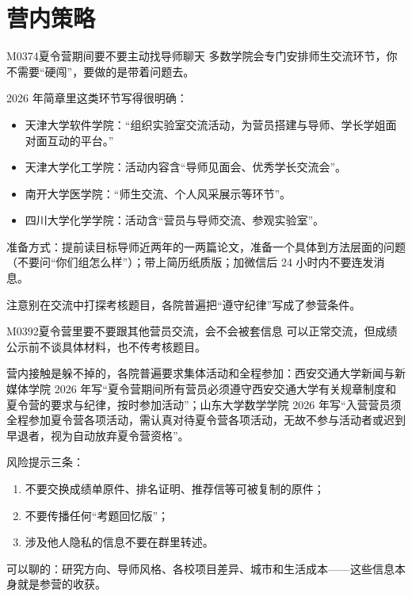 \section{营内策略}
\begin{qa}{M0374}{夏令营期间要不要主动找导师聊天}
多数学院会专门安排师生交流环节，你不需要“硬闯”，要做的是带着问题去。

2026 年简章里这类环节写得很明确：
\begin{itemize}
  \item 天津大学软件学院：“组织实验室交流活动，为营员搭建与导师、学长学姐面对面互动的平台。”
  \item 天津大学化工学院：活动内容含“导师见面会、优秀学长交流会”。
  \item 南开大学医学院：“师生交流、个人风采展示等环节”。
  \item 四川大学化学学院：活动含“营员与导师交流、参观实验室”。
\end{itemize}

准备方式：提前读目标导师近两年的一两篇论文，准备一个具体到方法层面的问题（不要问“你们组怎么样”）；带上简历纸质版；加微信后 24 小时内不要连发消息。

注意别在交流中打探考核题目，各院普遍把“遵守纪律”写成了参营条件。
\end{qa}

\begin{qa}{M0392}{夏令营里要不要跟其他营员交流，会不会被套信息}
可以正常交流，但成绩公示前不谈具体材料，也不传考核题目。

营内接触是躲不掉的，各院普遍要求集体活动和全程参加：西安交通大学新闻与新媒体学院 2026 年写“夏令营期间所有营员必须遵守西安交通大学有关规章制度和夏令营的要求与纪律，按时参加活动”；山东大学数学学院 2026 年写“入营营员须全程参加夏令营各项活动，需认真对待夏令营各项活动，无故不参与活动者或迟到早退者，视为自动放弃夏令营资格”。

风险提示三条：
\begin{enumerate}
  \item 不要交换成绩单原件、排名证明、推荐信等可被复制的原件；
  \item 不要传播任何“考题回忆版”；
  \item 涉及他人隐私的信息不要在群里转述。
\end{enumerate}

可以聊的：研究方向、导师风格、各校项目差异、城市和生活成本——这些信息本身就是参营的收获。
\end{qa}

